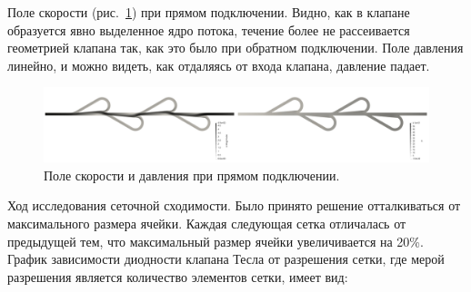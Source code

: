 \documentclass[10pt,a4paper]{book}
\begin{document}
    
    Поле скорости (рис.~\ref{fig:UPFieldsDirect}) при прямом подключении. Видно, как в клапане образуется явно выделенное ядро потока, течение более не рассеивается геометрией клапана так, как это было при обратном подключении. Поле давления линейно, и можно видеть, как отдаляясь от входа клапана, давление падает.
    
    \begin{figure}[H]
        \centering
        \includegraphics[width = 1\linewidth]{UPFieldsDirect}
        \caption{Поле скорости и давления при прямом подключении.}
        \label{fig:UPFieldsDirect}
    \end{figure}
    
    
    Ход исследования сеточной сходимости. Было принято решение отталкиваться от максимального размера ячейки. Каждая следующая сетка отличалась от предыдущей тем, что максимальный размер ячейки увеличивается на 20\%. График зависимости диодности клапана Тесла от разрешения сетки, где мерой разрешения является количество элементов сетки, имеет вид:
    
\end{document}
